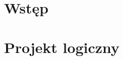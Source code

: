 \documentclass[12pt]{article} %
\author{Miłosz Mosur}
\author{Mateusz Ossowski}
\author{Maciej Ratajski}
\begin{document}
	\tableofcontents
	
	\newpage
	\section{Wstęp}
		
	\section{Projekt logiczny}
		
		
	\newpage
	
	
\end{document}
